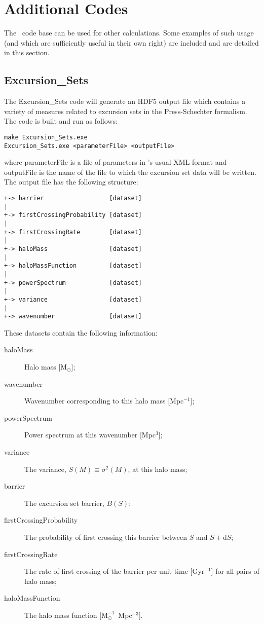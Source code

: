 \section{Additional Codes}

The \glc\ code base can be used for other calculations. Some examples of such usage (and which are sufficiently useful in their own right) are included and are detailed in this section.

\subsection{{\normalfont \ttfamily Excursion\_Sets}}

The {\normalfont \ttfamily Excursion\_Sets} code will generate an HDF5 output file which contains a variety of measures related to excursion sets in the Press-Schechter formalism. The code is built and run as follows:
\begin{verbatim}
make Excursion_Sets.exe
Excursion_Sets.exe <parameterFile> <outputFile>
\end{verbatim}
where {\normalfont \ttfamily parameterFile} is a file of parameters in \glc's usual XML format and {\normalfont \ttfamily outputFile} is the name of the file to which the excursion set data will be written. The output file has the following structure:
\begin{verbatim}
+-> barrier                  [dataset]
|
+-> firstCrossingProbability [dataset]
|
+-> firstCrossingRate        [dataset]
|
+-> haloMass                 [dataset]
|
+-> haloMassFunction         [dataset]
|
+-> powerSpectrum            [dataset]
|
+-> variance                 [dataset]
|
+-> wavenumber               [dataset]
\end{verbatim}
These datasets contain the following information:
\begin{description}
 \item [{\normalfont \ttfamily haloMass}] Halo mass [${\mathrm M}_\odot$];
 \item [{\normalfont \ttfamily wavenumber}] Wavenumber corresponding to this halo mass [Mpc$^{-1}$];
 \item [{\normalfont \ttfamily powerSpectrum}] Power spectrum at this wavenumber [Mpc$^3$];
 \item [{\normalfont \ttfamily variance}] The variance, $S(M)\equiv\sigma^2(M)$, at this halo mass;
 \item [{\normalfont \ttfamily barrier}] The excursion set barrier, $B(S)$;
 \item [{\normalfont \ttfamily firstCrossingProbability}] The probability of first crossing this barrier between $S$ and $S+{\mathrm d}S$;
 \item [{\normalfont \ttfamily firstCrossingRate}] The rate of first crossing of the barrier per unit time [Gyr$^{-1}$] for all pairs of halo mass;
 \item [{\normalfont \ttfamily haloMassFunction}] The halo mass function [${\mathrm M}^{-1}_\odot$~Mpc$^{-3}$].
\end{description}

